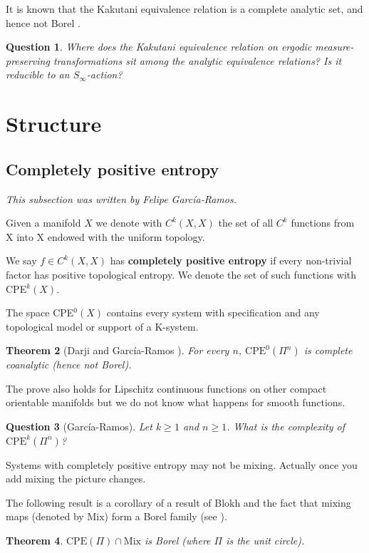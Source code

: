 \documentclass{article}
\newtheorem{theorem}{Theorem}[section]
\newtheorem{question}[theorem]{Question}
\theoremstyle{definition}
\begin{document}
It is known that the Kakutani equivalence relation is a complete analytic set, and hence not Borel \cite{Gerber}. 

\begin{question} Where does the Kakutani equivalence relation on ergodic measure-preserving transformations sit among the analytic equivalence relations? Is it reducible to an $S_\infty$-action? 
\end{question}
\section{Structure}

\subsection{Completely positive entropy}
\textit{This subsection was written by Felipe García-Ramos.}


Given a manifold $X$ we denote with $C^k(X,X)$ the set of all $C^k$ functions from X into X endowed with the uniform topology. 

We say $f\in C^k(X,X)$ has \textbf{completely positive entropy} if every non-trivial factor has positive topological entropy. We denote the set of such functions with CPE$^k(X)$. 

The space CPE$^0(X)$ contains every system with specification and any topological model or support of a K-system. 
\begin{theorem}
[Darji and García-Ramos \cite{Darji}] For every $n$, $\mathrm{CPE}^0(\Pi^n)$ is complete coanalytic (hence not Borel). 
\end{theorem}
The prove also holds for Lipschitz continuous functions on other compact orientable manifolds but we do not know what happens for smooth functions. 
\begin{question}[García-Ramos]
Let $k\geq 1$ and $n\geq 1$. What is the complexity of $\mathrm{CPE}^k(\Pi^n)$? 
\end{question}


Systems with completely positive entropy may not be mixing. Actually once you add mixing the picture changes. 


The following result is a corollary of a result of Blokh and the fact that mixing maps (denoted by $\mathrm{Mix}$) form a Borel family (see \cite{Darji}).  
\begin{theorem}
$\mathrm{CPE}(\Pi)\cap\mathrm{Mix}$ is Borel (where $\Pi$ is the unit circle).
\end{theorem}
\end{document}
